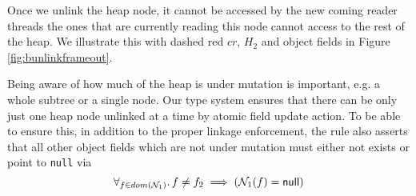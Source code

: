 Once we unlink the heap node, it cannot be accessed by the new coming reader threads the ones that are currently reading this node cannot access to the rest of the heap. We illustrate this with dashed red $cr$, $H_2$ and object fields in Figure \ref{fig:bunlinkframeout}.

Being aware of how much of the heap is under mutation is important, e.g. a whole subtree or a single node. Our type system ensures that there can be only just one heap node unlinked at a time by atomic field update action. To be able to ensure this, in addition to the proper linkage enforcement, the rule also asserts that all other object fields which are not under mutation must either not exists or point to \texttt{null} via
\[\forall_{f\in dom(\mathcal{N}_1)} \ldotp f\neq f_2 \implies (\mathcal{N}_1(f) = \textsf{null})\] 
